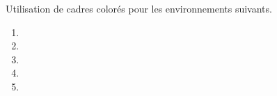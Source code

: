 \documentclass[12pt, a4paper]{article}
\begin{document}
\begin{tdocnew}
    \item Utilisation de cadres colorés pour les environnements suivants.
    \begin{enumerate}
    	\item {}
    	\item {}
    	\item {}
    	\item {}
    	\item {}
    \end{enumerate}
\end{tdocnew}
\end{document}
